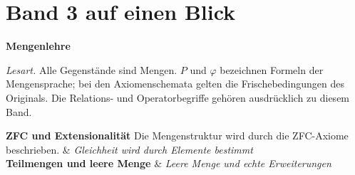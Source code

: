 \chapter[Band 3: Mengenlehre]{Band 3 auf einen Blick}
\noindent\textbf{Mengenlehre}\par\medskip
\noindent\emph{Lesart.} Alle Gegenstände sind Mengen. \(P\) und
\(\varphi\) bezeichnen Formeln der Mengensprache; bei den Axiomenschemata
gelten die Frischebedingungen des Originals. Die Relations- und
Operatorbegriffe gehören ausdrücklich zu diesem Band.
\begin{BandUebersicht}
\textbf{ZFC und Extensionalität}
Die Mengenstruktur wird durch die ZFC-Axiome beschrieben.
&
\textit{Gleichheit wird durch Elemente bestimmt}
\\
\addlinespace[.8ex]
\textbf{Teilmengen und leere Menge}
&
\textit{Leere Menge und echte Erweiterungen}
\end{BandUebersicht}
